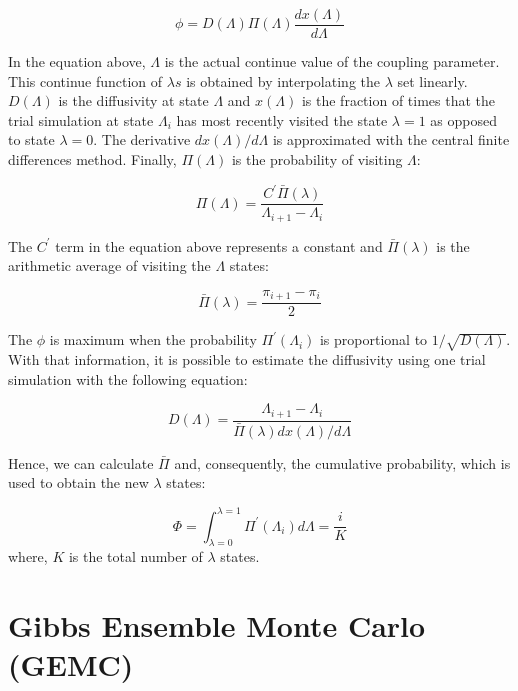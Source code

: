 \begin{equation}
\phi = D(\Lambda) \Pi (\Lambda) \dfrac{dx(\Lambda)}{d \Lambda}
\label{eqn:stream}
\end{equation}

In the equation above, $\Lambda$ is the actual continue value of the coupling parameter. This continue function of $\lambda s$ is obtained by interpolating the $\lambda$ set linearly. $D(\Lambda)$ is the diffusivity at  state $\Lambda$ and $x(\Lambda)$ is the fraction of times that the trial simulation at state $\Lambda_{i}$ has most recently visited the state $\lambda=1$ as opposed to state $\lambda=0$. The derivative ${dx(\Lambda)}/{d \Lambda}$ is approximated with the central finite differences method. Finally, $\Pi (\Lambda)$ is the probability of visiting $\Lambda$:

\begin{equation}
\Pi (\Lambda) = \dfrac{C^{'} \bar{\Pi} (\lambda)}{\Lambda_{i+1} - \Lambda_{i}}
\label{eqn:plambda}
\end{equation}

The $C^{'} $ term in the equation above represents a constant and $\bar{\Pi} (\lambda)$ is the arithmetic average of visiting the $\Lambda$ states:

\begin{equation}
\bar{\Pi} (\lambda) = \dfrac{\pi_{i+1} - \pi_{i}}{2}
\label{eqn:barplambda}
\end{equation}

The $\phi$ is maximum when the probability $\Pi^{'}(\Lambda_{i})$ is proportional to $1/\sqrt{D(\Lambda)}$. With that information, it is possible to estimate the diffusivity using one trial simulation with the following equation:

\begin{equation}
D(\Lambda) = \dfrac{\Lambda_{i+1} - \Lambda_{i}}{\bar{\Pi} (\lambda) {dx(\Lambda)}/{d \Lambda}}
\label{eqn:diff}
\end{equation}

Hence, we can calculate $\bar{\Pi} $ and, consequently, the cumulative probability, which is used to obtain the new $\lambda$ states:

\begin{equation}
\Phi = \int_{\lambda =0}^{\lambda =1} \Pi^{'}(\Lambda_{i}) d \Lambda = \dfrac{i}{K}
\label{eqn:cumfun}
\end{equation}
where, $K$ is the total number of $\lambda$ states. 

\section{Gibbs Ensemble Monte Carlo (GEMC)}\label{gemc}

